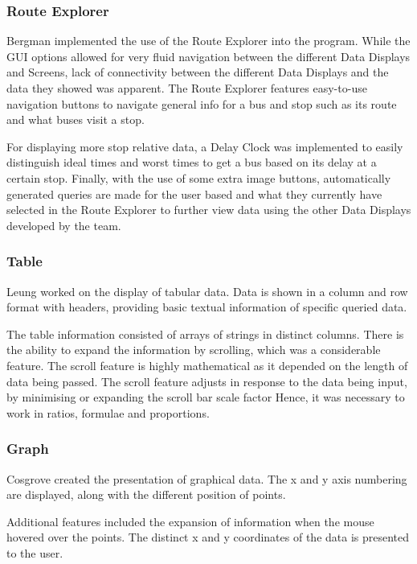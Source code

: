 \documentclass[]{article}
\begin{document}
	\subsubsection{Route Explorer}
	
	Bergman implemented the use of the Route Explorer into the program. While the GUI options allowed for very fluid navigation between the different Data Displays and Screens, lack of connectivity between the different Data Displays and the data they showed was apparent. The Route Explorer features easy-to-use navigation buttons to navigate general info for a bus and stop such as its route and what buses visit a stop. 
	
	For displaying more stop relative data, a Delay Clock was implemented to easily distinguish ideal times and worst times to get a bus based on its delay at a certain stop. Finally, with the use of some extra image buttons, automatically generated queries are made for the user based and what they currently have selected in the Route Explorer to further view data using the other Data Displays developed by the team.
	
	\subsubsection{Table}
	
	Leung worked on the display of tabular data. Data is shown in a column and row format with headers, providing basic textual information of specific queried data.
	
	The table information consisted of arrays of strings in distinct columns. There is the ability to expand the information by scrolling, which was a considerable feature. The scroll feature is highly mathematical as it depended on the length of data being passed. The scroll feature adjusts in response to the data being input, by minimising or expanding the scroll bar scale factor Hence, it was necessary to work in ratios, formulae and proportions.
	
	\subsubsection{Graph}
	
	Cosgrove created the presentation of graphical data. The x and y axis numbering are displayed, along with the different position of points.
	
	Additional features included the expansion of information when the mouse hovered over the points. The distinct x and y coordinates of the data is presented to the user.
	
\end{document}
